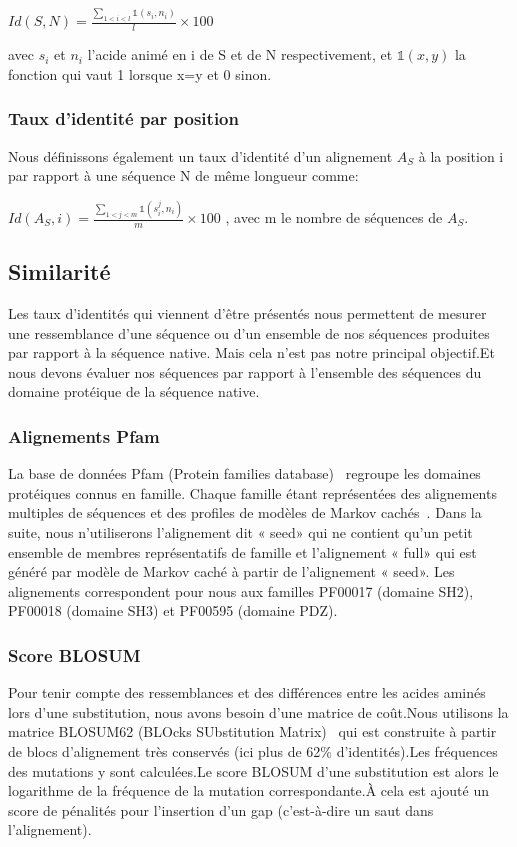  $ Id(S,N) =\frac{\sum_{1<i<l} \mathds{1}(s_i,n_i)}{l} \times 100$ 

avec $s_i$ et $n_i$ l'acide animé en i de S et de N respectivement, et $\mathds{1}(x,y)$ la fonction qui vaut 1 lorsque x=y et 0 sinon. 

\subsubsection{Taux d'identité par position}

Nous définissons également un taux d'identité d'un alignement $A_S$  à la position i par rapport à une séquence N de même longueur comme:

$Id(A_{S},i) = \frac{\sum_{1<j<m} \mathds{1}(s_i^j,n_i)}{m} \times 100$ , avec m le nombre de séquences de $A_S$.

\subsection{Similarité}

Les taux d'identités qui viennent d'être présentés nous permettent de mesurer une ressemblance d'une séquence ou d'un ensemble de nos séquences produites par rapport à la séquence native. Mais cela n'est pas notre principal objectif.Et nous devons évaluer nos séquences par rapport à l'ensemble des séquences du domaine protéique de la séquence native.  

   \subsubsection{Alignements Pfam} 
La base de données Pfam (Protein families database)~\citep{refPfam} regroupe les domaines protéiques connus en famille. Chaque famille  étant représentées des alignements multiples de séquences et des profiles de modèles de Markov cachés~\citep{refPfam}. Dans la suite, nous n'utiliserons l'alignement dit « seed» qui ne contient qu'un petit ensemble de membres représentatifs de famille et l'alignement « full» qui est généré par modèle de Markov caché à partir de l'alignement « seed». Les alignements correspondent pour nous aux familles PF00017 (domaine SH2), PF00018  (domaine SH3) et PF00595 (domaine PDZ).

 \subsubsection{Score BLOSUM}

Pour tenir compte des ressemblances et des différences entre les acides aminés lors d'une substitution, nous avons besoin d'une matrice de coût.Nous utilisons la matrice BLOSUM62 (BLOcks SUbstitution Matrix)~\citep{refBLOSUM} qui est construite à partir de blocs d'alignement très conservés (ici plus de 62\% d'identités).Les fréquences des mutations y sont calculées.Le score BLOSUM d'une substitution est alors le logarithme de la fréquence de la mutation correspondante.À cela est ajouté un score de pénalités pour l'insertion d'un gap (c'est-à-dire un saut dans l'alignement).

